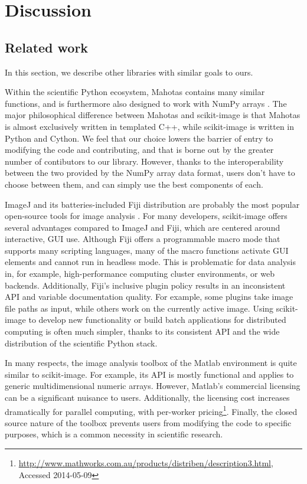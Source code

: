 
\section*{Discussion}
  \label{sec:discussion}

  \subsection*{Related work}

  In this section, we describe other libraries with similar goals to ours.
  
  Within the scientific Python ecosystem, Mahotas contains many similar
  functions, and is furthermore also designed to work with NumPy arrays
  \citep{Mahotas}. The major philosophical difference between Mahotas and
  scikit-image is that Mahotas is almost exclusively written in templated C++,
  while scikit-image is written in Python and Cython. We feel that our choice
  lowers the barrier of entry to modifying the code and contributing, and that
  is borne out by the greater number of contibutors to our library. However,
  thanks to the interoperability between the two provided by the NumPy array
  data format, users don't have to choose between them, and can simply use the
  best components of each.

  ImageJ and its batteries-included Fiji distribution are probably the most
  popular open-source tools for image analysis \citep{imagej,Fiji}. For many
  developers, scikit-image offers several advantages compared to ImageJ and 
  Fiji, which are centered around interactive, GUI use. Although Fiji offers a
  programmable macro mode that supports many scripting languages, many of the
  macro functions activate GUI elements and cannot run in headless mode. This
  is problematic for data analysis in, for example, high-performance computing
  cluster environments, or web backends. Additionally, Fiji's inclusive plugin
  policy results in an inconsistent API and variable documentation quality. For example,
  some plugins take image file paths as input, while others work on the
  currently active image. Using scikit-image to develop new functionality or
  build batch applications for distributed computing is often much simpler,
  thanks to its consistent API and the wide distribution of the scientific
  Python stack.

  In many respects, the image analysis toolbox of the Matlab environment is
  quite similar to scikit-image. For example, its API is mostly functional and
  applies to generic multidimensional numeric arrays. However, Matlab's
  commercial licensing can be a significant nuisance to users. Additionally,
  the licensing cost increases dramatically for parallel computing, with
  per-worker pricing\footnote{\url{http://www.mathworks.com.au/products/distriben/description3.html}, Accessed 2014-05-09}.
  Finally, the closed source nature of the toolbox prevents users from
  modifying the code to specific purposes, which is a common necessity in
  scientific research.


